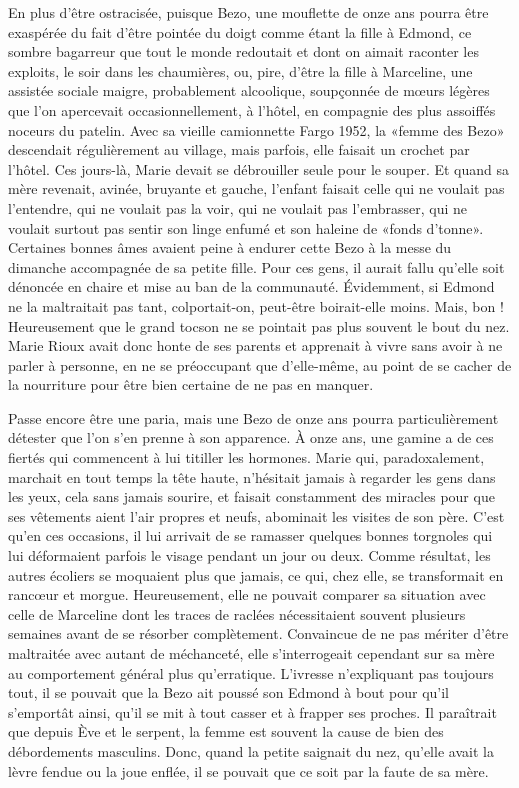 En plus d’être ostracisée, puisque Bezo, une mouflette de onze ans pourra être exaspérée du fait d’être pointée du doigt comme étant la fille à Edmond, ce sombre bagarreur que tout le monde redoutait et dont on aimait raconter les exploits, le soir dans les chaumières, ou, pire, d’être la fille à Marceline, une assistée sociale maigre, probablement alcoolique, soupçonnée de mœurs légères que l’on apercevait occasionnellement, à l’hôtel, en compagnie des plus assoiffés noceurs du patelin. Avec sa vieille camionnette Fargo 1952, la «femme des Bezo» descendait régulièrement au village, mais parfois, elle faisait un crochet par l’hôtel. Ces jours-là, Marie devait se débrouiller seule pour le souper. Et quand sa mère revenait, avinée, bruyante et gauche, l’enfant faisait celle qui ne voulait pas l’entendre, qui ne voulait pas la voir, qui ne voulait pas l’embrasser, qui ne voulait surtout pas sentir son linge enfumé et son haleine de «fonds d’tonne». Certaines bonnes âmes avaient peine à endurer cette Bezo à la messe du dimanche accompagnée de sa petite fille. Pour ces gens, il aurait fallu qu’elle soit dénoncée en chaire et mise au ban de la communauté. Évidemment, si Edmond ne la maltraitait pas tant, colportait-on, peut-être boirait-elle moins. Mais, bon ! Heureusement que le grand tocson ne se pointait pas plus souvent le bout du nez. Marie Rioux avait donc honte de ses parents et apprenait à vivre sans avoir à ne parler à personne, en ne se préoccupant que d’elle-même, au point de se cacher de la nourriture pour être bien certaine de ne pas en manquer.

Passe encore être une paria, mais une Bezo de onze ans pourra particulièrement détester que l’on s’en prenne à son apparence. À onze ans, une gamine a de ces fiertés qui commencent à lui titiller les hormones. Marie qui, paradoxalement, marchait en tout temps la tête haute, n’hésitait jamais à regarder les gens dans les yeux, cela sans jamais sourire, et faisait constamment des miracles pour que ses vêtements aient l’air propres et neufs, abominait les visites de son père. C’est qu’en ces occasions, il lui arrivait de se ramasser quelques bonnes torgnoles qui lui déformaient parfois le visage pendant un jour ou deux. Comme résultat, les autres écoliers se moquaient plus que jamais, ce qui, chez elle, se transformait en rancœur et morgue. Heureusement, elle ne pouvait comparer sa situation avec celle de Marceline dont les traces de raclées nécessitaient souvent plusieurs semaines avant de se résorber complètement. Convaincue de ne pas mériter d’être maltraitée avec autant de méchanceté, elle s’interrogeait cependant sur sa mère au comportement général plus qu’erratique. L’ivresse n’expliquant pas toujours tout, il se pouvait que la Bezo ait poussé son Edmond à bout pour qu’il s’emportât ainsi, qu’il se mit à tout casser et à frapper ses proches. Il paraîtrait que depuis Ève et le serpent, la femme est souvent la cause de bien des débordements masculins. Donc, quand la petite saignait du nez, qu’elle avait la lèvre fendue ou la joue enflée, il se pouvait que ce soit par la faute de sa mère.

